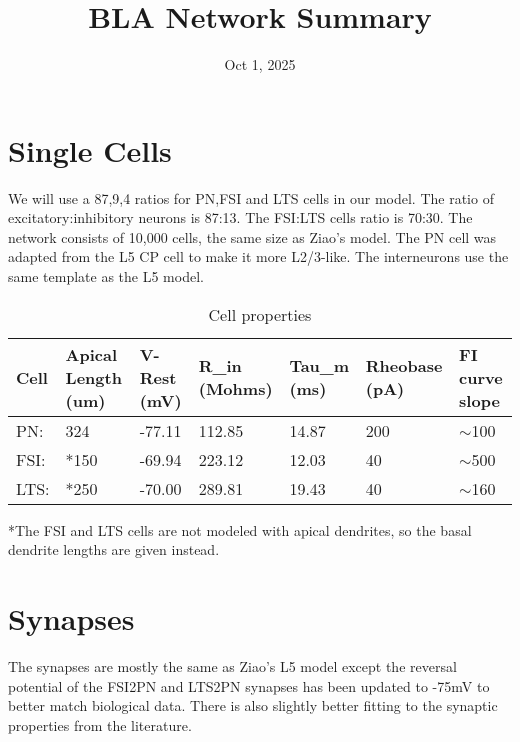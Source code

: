 \documentclass[12pt, letterpaper]{article}
\title{BLA Network Summary}
\date{Oct 1, 2025}
\begin{document}
\pagestyle{empty} %
\maketitle
\thispagestyle{empty} %

\section*{Single Cells}
We will use a 87,9,4 ratios for PN,FSI and LTS cells in our model. 
The ratio of excitatory:inhibitory neurons is 87:13\cite{Lefort2009}. 
The FSI:LTS cells ratio is 70:30\cite{Kätzel2010}\cite{Wall2016}.
The network consists of 10,000 cells, the same size as Ziao's model. 
The PN cell was adapted from the L5 CP cell to make it more L2/3-like\cite{Hirai2012}. 
The interneurons use the same template as the L5 model.

\begin{table}[H]
  \centering
  \caption{Cell properties}
  \begin{tabularx}{\textwidth}{|X|X|X|X|X|X|X|}
  \hline
  Cell & Apical Length (um) & V-Rest (mV) & R\_in (Mohms) & Tau\_m (ms) & Rheobase (pA) & FI curve slope \\ \hline
  PN:  & 324\cite{Ledergerber2010} & -77.11\cite{Hirai2012} & 112.85\cite{Hirai2012}  & 14.87\cite{Hirai2012}  & 200\cite{Hirai2012}   & $\sim$100\cite{Hirai2012}      \\ \hline
  FSI: & *150               & -69.94\cite{Tanaka2011}     & 223.12\cite{Tanaka2011}       & 12.03\cite{Tanaka2011}      & 40           & $\sim$500      \\ \hline
  LTS: & *250               & -70.00\cite{Tanaka2011}     & 289.81\cite{Tanaka2011}       & 19.43\cite{Tanaka2011}      & 40           & $\sim$160      \\ \hline
  \end{tabularx}
\end{table}
*The FSI and LTS cells are not modeled with apical dendrites, so the basal dendrite lengths are given instead.

\section*{Synapses}
The synapses are mostly the same as Ziao's L5 model except the reversal potential of the FSI2PN and LTS2PN synapses has been updated to -75mV to better match biological data\cite{Beierlein2003}.
There is also slightly better fitting to the synaptic properties from the literature.
\end{document}
